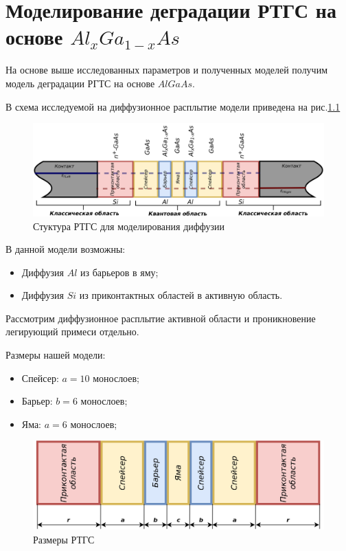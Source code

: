 \chapter{Моделирование деградации РТГС на основе $Al_{x}Ga_{1−x}As$}
На основе выше исследованных параметров и полученных моделей получим модель деградации РГТС на основе $AlGaAs$.

В схема исследуемой на диффузионное расплытие модели приведена на рис.\ref{fig:RTHSModelDiff}

\begin{figure}
	\centering
	\includegraphics[width=0.9\linewidth]{assets/RTHSModelDiff}
	\caption{Стуктура РТГС для моделирования диффузии}
	\label{fig:RTHSModelDiff}
\end{figure}

В данной модели возможны:
\begin{itemize}
	\item Диффузия $Al$ из барьеров в яму;
	\item Диффузия $Si$ из приконтактных областей в активную область.
\end{itemize}

Рассмотрим диффузионное расплытие активной области и проникновение легирующий примеси отдельно.

Размеры нашей модели:
\begin{itemize}
	\item Спейсер: $a = 10$ монослоев;
	\item Барьер: $b = 6$ монослоев;
	\item Яма: $a = 6$ монослоев;
\end{itemize}

\begin{figure}
	\centering
	\includegraphics[width=0.7\linewidth]{assets/RTHS}
	\caption{Размеры РТГС}
	\label{fig:RTHS}
\end{figure}

